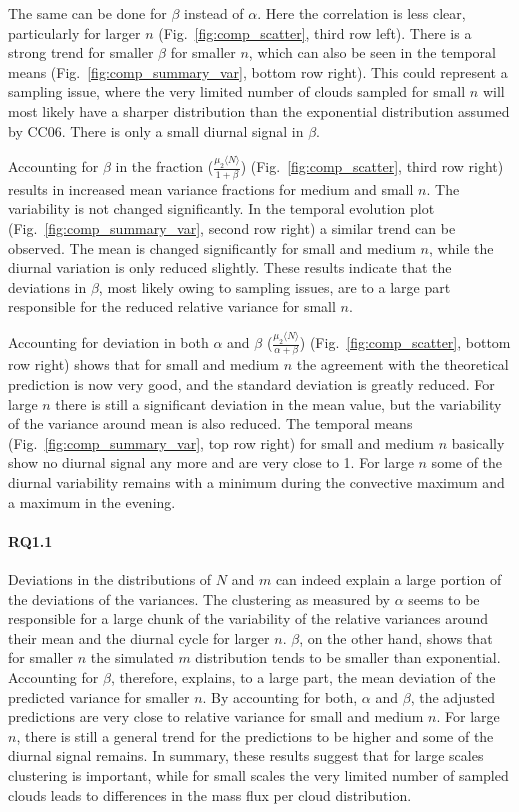\documentclass[a4paper, 12pt]{article}
\begin{document}
The same can be done for $\beta$ instead of $\alpha$. Here the correlation is less clear, particularly for larger $n$ (Fig.~\ref{fig:comp_scatter}, third row left). There is a strong trend for smaller $\beta$ for smaller $n$, which can also be seen in the temporal means (Fig.~\ref{fig:comp_summary_var}, bottom row right). This could represent a sampling issue, where the very limited number of clouds sampled for small $n$ will most likely have a sharper distribution than the exponential distribution assumed by CC06. There is only a small diurnal signal in $\beta$.

Accounting for $\beta$ in the fraction ($\frac{\mu_2 \langle N \rangle}{1+\beta}$) (Fig.~\ref{fig:comp_scatter}, third row right) results in increased mean variance fractions for medium and small $n$. The variability is not changed significantly. In the temporal evolution plot (Fig.~\ref{fig:comp_summary_var}, second row right) a similar trend can be observed. The mean is changed significantly for small and medium $n$, while the diurnal variation is only reduced slightly. These results indicate that the deviations in $\beta$, most likely owing to sampling issues, are to a large part responsible for the reduced relative variance for small $n$.

Accounting for deviation in both $\alpha$ and $\beta$ ($\frac{\mu_2 \langle N \rangle}{\alpha + \beta}$) (Fig.~\ref{fig:comp_scatter}, bottom row right) shows that for small and medium $n$ the agreement with the theoretical prediction is now very good, and the standard deviation is greatly reduced. For large $n$ there is still a significant deviation in the mean value, but the variability of the variance around mean is also reduced. The temporal means (Fig.~\ref{fig:comp_summary_var}, top row right) for small and medium $n$ basically show no diurnal signal any more and are very close to 1. For large $n$ some of the diurnal variability remains with a minimum during the convective maximum and a maximum in the evening. 

\paragraph{RQ1.1} Deviations in the distributions of $N$ and $m$ can indeed explain a large portion of the deviations of the variances. The clustering as measured by $\alpha$ seems to be responsible for a large chunk of the variability of the relative variances around their mean and the diurnal cycle for larger $n$. $\beta$, on the other hand, shows that for smaller $n$ the simulated $m$ distribution tends to be smaller than exponential. Accounting for $\beta$, therefore, explains, to a large part, the mean deviation of the predicted variance for smaller $n$. By accounting for both, $\alpha$ and $\beta$, the adjusted predictions are very close to relative variance for small and medium $n$. For large $n$, there is still a general trend for the predictions to be higher and some of the diurnal signal remains. In summary, these results suggest that for large scales clustering is important, while for small scales the very limited number of sampled clouds leads to differences in the mass flux per cloud distribution. 
\end{document}
